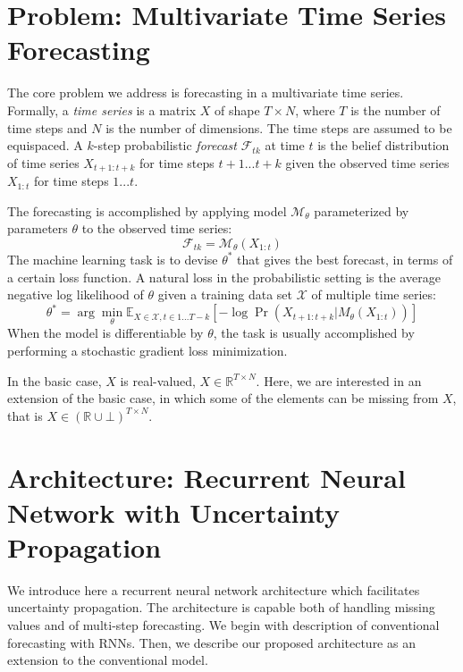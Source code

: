 \documentclass[runningheads]{llncs}
\begin{document}
\section{Problem: Multivariate Time Series Forecasting}

The core problem we address is forecasting in a multivariate
time series. Formally, a \textit{time series} is a matrix $X$
of shape $T\times N$, where $T$ is the number of time steps and
$N$ is the number of dimensions. The time steps are assumed to
be equispaced.  A $k$-step probabilistic \textit{forecast}
$\mathcal{F}_{tk}$ at time $t$ is the belief distribution of
time series $X_{t+1:t+k}$ for time steps $t+1 ... t+k$ given the
observed time series $X_{1:t}$ for time steps $1...t$.  

The forecasting is accomplished by applying model $\mathcal{M}_\theta$
parameterized by parameters $\theta$ to the observed time
series:
\begin{equation}
\mathcal{F}_{tk} = \mathcal{M}_\theta(X_{1:t})
\end{equation}
The machine learning task is to devise $\theta^*$
that gives the best forecast, in terms of a certain loss
function. A natural loss in the probabilistic setting is the
average negative log likelihood of $\theta$ given a training
data set $\mathcal{X}$ of multiple time series:
\begin{equation}
	\theta^* = \arg\min_\theta \mathbb{E}_{X \in \mathcal{X},t
	\in 1 ... T-k}\left[ -\log \Pr(X_{t+1:t+k}|M_\theta(X_{1:t}))\right]
	\label{eqn:theta-star}
\end{equation}
When the model is differentiable by $\theta$, the task is
usually accomplished by performing a stochastic gradient loss
minimization.

In the basic case, $X$ is real-valued, $X \in \mathbb{R}^{T
\times N}$. Here, we are interested in an extension of the basic
case, in which some of the elements can be missing from $X$, that is
$X \in (\mathbb{R} \cup \bot)^{T \times N}$.

\section{Architecture: Recurrent Neural Network with Uncertainty Propagation}

We introduce here a recurrent neural network architecture which
facilitates uncertainty propagation. The architecture is capable
both of handling missing values and of multi-step forecasting.
We begin with description of conventional forecasting with RNNs.
Then, we describe our proposed architecture as an extension to
the conventional model.
\end{document}
